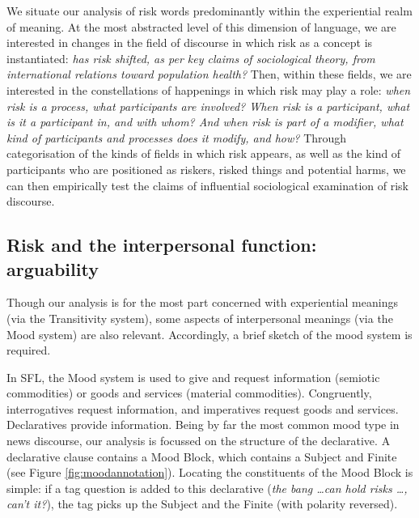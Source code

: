 
			We situate our analysis of risk words predominantly within the experiential realm of meaning. At the most abstracted level of this dimension of language, we are interested in changes in the field of discourse in which risk as a concept is instantiated: \emph{has risk shifted, as per key claims of sociological theory, from international relations toward population health?} Then, within these fields, we are interested in the constellations of happenings in which risk may play a role: \emph{when risk is a process, what participants are involved? When risk is a participant, what is it a participant in, and with whom? And when risk is part of a modifier, what kind of participants and processes does it modify, and how?} Through categorisation of the kinds of fields in which risk appears, as well as the kind of participants who are positioned as riskers, risked things and potential harms, we can then empirically test the claims of influential sociological examination of risk discourse. %



	\subsection{Risk and the interpersonal function: arguability}

		Though our analysis is for the most part concerned with experiential meanings (via the Transitivity system), some aspects of interpersonal meanings (via the Mood system) are also relevant. Accordingly, a brief sketch of the mood system is required.

		In SFL, the Mood system is used to give and request information (semiotic commodities) or goods and services (material commodities). Congruently, interrogatives request information, and imperatives request goods and services. Declaratives provide information. Being by far the most common mood type in news discourse, our analysis is focussed on the structure of the declarative. A declarative clause contains a Mood Block, which contains a Subject and Finite (see Figure \ref{fig:moodannotation}). Locating the constituents of the Mood Block is simple: if a tag question is added to this declarative (\emph{the bang \dots can hold risks \dots, can't it?}), the tag picks up the Subject and the Finite (with polarity reversed).

